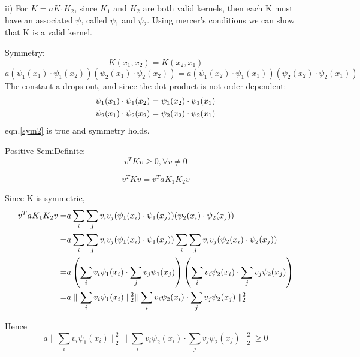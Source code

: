 \documentclass[12pt]{article}
\begin{document}
ii) For $K = aK_1K_2$, since $K_1$ and $K_2$ are both valid kernels, then each K must 
have an associated $\psi$, called $\psi_1$ and $\psi_2$. Using mercer's conditions 
we can show that K is a valid kernel. 

Symmetry: 
\begin{equation}
    K(x_1,x_2) = K(x_2,x_1)
\end{equation}
\begin{equation}
    a\left(\psi_1(x_1)\cdot\psi_1(x_2)\right)\left(\psi_2(x_1)\cdot\psi_2(x_2)\right) 
    = a\left(\psi_1(x_2)\cdot\psi_1(x_1)\right)\left(\psi_2(x_2)\cdot\psi_2(x_1)\right)
    \label{sym2}
\end{equation}
The constant a drops out, and since the dot product is not order dependent: 
\begin{align}
    \psi_1(x_1)\cdot\psi_1(x_2) = \psi_1(x_2)\cdot\psi_1(x_1) \notag \\
    \psi_2(x_1)\cdot\psi_2(x_2) = \psi_2(x_2)\cdot\psi_2(x_1)
\end{align}
eqn.\ref{sym2} is true and symmetry holds. 

Positive SemiDefinite: 
\begin{equation}
    v^T K v \geq 0, \forall v\neq 0
\end{equation}

\begin{equation}
    v^T K v = v^T aK_1K_2 v
\end{equation}

Since K is symmetric, 
\begin{align}
    v^T aK_1K_2 v =& a \sum_i\sum_jv_iv_j (\psi_1(x_i) \cdot \psi_1(x_j))(\psi_2(x_i) \cdot \psi_2(x_j)) \notag \\
    =& a \sum_i\sum_jv_iv_j (\psi_1(x_i) \cdot \psi_1(x_j)) \sum_i\sum_jv_iv_j(\psi_2(x_i) \cdot \psi_2(x_j)) \notag \\
    =& a \left(\sum_iv_i\psi_1(x_i)\cdot\sum_jv_j\psi_1(x_j)\right) \left(\sum_iv_i\psi_2(x_i)\cdot\sum_jv_j\psi_2(x_j)\right) \notag \\
    =& a \parallel\sum_iv_i\psi_1(x_i)\parallel_2^2 \parallel\sum_iv_i\psi_2(x_i)\cdot\sum_jv_j\psi_2(x_j)\parallel_2^2
\end{align}

Hence
\begin{equation}
    a \parallel\sum_iv_i\psi_1(x_i)\parallel_2^2 \parallel\sum_iv_i\psi_2(x_i)\cdot\sum_jv_j\psi_2(x_j)\parallel_2^2 \geq 0
\end{equation}
\end{document}
